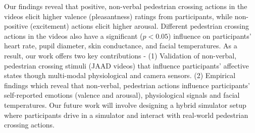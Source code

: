 \documentclass[acmlarge]{acmart}
\begin{document}
Our findings reveal that positive, non-verbal pedestrian crossing actions in the videos elicit higher valence (pleasantness) ratings from participants, while non-positive (excitement) actions elicit higher arousal. Different pedestrian crossing actions in the videos also have a significant ($p<0.05$) influence on participants' heart rate, pupil diameter, skin conductance, and facial temperatures. As a result, our work offers two key contributions -  (1) Validation of non-verbal, pedestrian crossing stimuli (JAAD videos) that influence participants' affective states though multi-modal physiological and camera sensors. (2) Empirical findings which reveal that non-verbal, pedestrian actions influence participants' self-reported emotions (valence and arousal), physiological signals and facial temperatures. Our future work will involve designing a hybrid simulator setup where participants drive in a simulator and interact with real-world pedestrian crossing actions.

\end{document}
